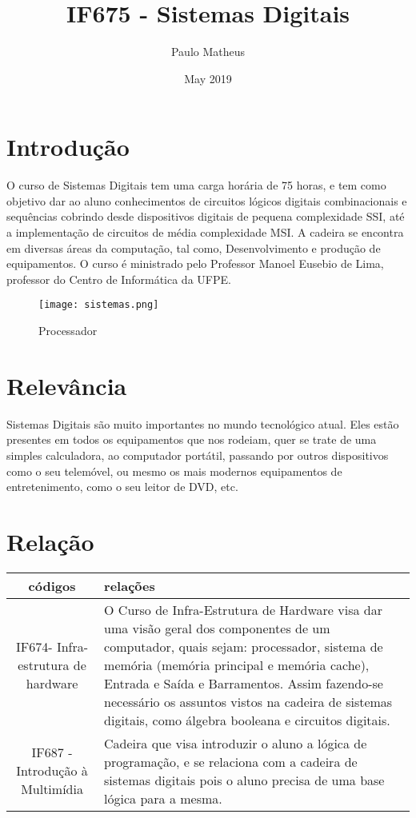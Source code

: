 \documentclass[10pt]{article}
\title{IF675 - Sistemas Digitais}
\author{Paulo Matheus}
\date{May 2019}
\begin{document}
\maketitle

\section{Introdução}
O curso de Sistemas Digitais tem uma carga horária de 75 horas, e tem como objetivo dar ao aluno conhecimentos de circuitos lógicos digitais combinacionais e sequências cobrindo desde dispositivos digitais de pequena complexidade SSI, até a implementação de circuitos de média complexidade MSI. A cadeira se encontra em diversas áreas da computação, tal como, Desenvolvimento e produção de equipamentos. 
O curso é ministrado pelo Professor Manoel Eusebio de Lima,  professor do Centro de Informática da UFPE.
\cite{intro}


\begin{figure}[h!]
\centering
\texttt{[image: sistemas.png]}
\caption{Processador}
\label{fig:processador}
\end{figure}


\section{Relevância}
Sistemas Digitais são muito importantes no mundo tecnológico atual. Eles estão presentes em todos os equipamentos que nos rodeiam, quer se trate de uma simples calculadora, ao computador portátil, passando por outros dispositivos como o seu telemóvel, ou mesmo os mais modernos equipamentos de entretenimento, como o seu leitor de DVD, etc.\cite{relevancia}

\section{Relação}

\begin{center}
\begin{tabular}{|c|p{6cm}|}
\hline
códigos & relações \\ \hline
 IF674- Infra-estrutura de hardware &
 O Curso de Infra-Estrutura de Hardware visa dar uma visão geral dos componentes de um computador, quais sejam: processador, sistema de memória (memória principal e memória cache), Entrada e Saída e Barramentos. Assim fazendo-se necessário os assuntos vistos na cadeira de sistemas digitais, como álgebra booleana e circuitos digitais. \cite{IF674}\cite{infra}
 \\ \hline
  IF687 - Introdução à Multimídia  & 
Cadeira que visa introduzir o aluno a lógica de programação, e se relaciona com a cadeira de sistemas digitais pois o aluno precisa de uma base lógica para a mesma. \cite{IF669}
\\ \hline

\end{tabular}    
\end{center}



\end{document}
